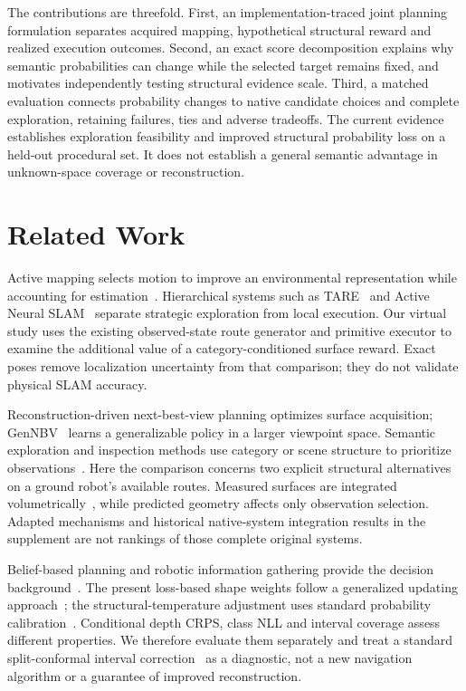 The contributions are threefold. First, an implementation-traced joint planning formulation separates acquired mapping, hypothetical structural reward and realized execution outcomes. Second, an exact score decomposition explains why semantic probabilities can change while the selected target remains fixed, and motivates independently testing structural evidence scale. Third, a matched evaluation connects probability changes to native candidate choices and complete exploration, retaining failures, ties and adverse tradeoffs. The current evidence establishes exploration feasibility and improved structural probability loss on a held-out procedural set. It does not establish a general semantic advantage in unknown-space coverage or reconstruction.

\section{Related Work}\label{related-work}
Active mapping selects motion to improve an environmental representation while accounting for estimation~\cite{ref10}. Hierarchical systems such as TARE~\cite{ref5} and Active Neural SLAM~\cite{ref1} separate strategic exploration from local execution. Our virtual study uses the existing observed-state route generator and primitive executor to examine the additional value of a category-conditioned surface reward. Exact poses remove localization uncertainty from that comparison; they do not validate physical SLAM accuracy.

Reconstruction-driven next-best-view planning optimizes surface acquisition; GenNBV~\cite{ref6} learns a generalizable policy in a larger viewpoint space. Semantic exploration and inspection methods use category or scene structure to prioritize observations~\cite{ref2,ref7,ref3,ref8}. Here the comparison concerns two explicit structural alternatives on a ground robot's available routes. Measured surfaces are integrated volumetrically~\cite{ref4,ref11}, while predicted geometry affects only observation selection. Adapted mechanisms and historical native-system integration results in the supplement are not rankings of those complete original systems.

Belief-based planning and robotic information gathering provide the decision background~\cite{ref12,ref13}. The present loss-based shape weights follow a generalized updating approach~\cite{bissiri2016}; the structural-temperature adjustment uses standard probability calibration~\cite{pmlr-v70-guo17a}. Conditional depth CRPS, class NLL and interval coverage assess different properties. We therefore evaluate them separately and treat a standard split-conformal interval correction~\cite{Angelopoulos_2023} as a diagnostic, not a new navigation algorithm or a guarantee of improved reconstruction.
